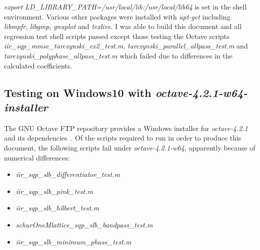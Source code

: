 \documentclass[a4paper,twoside,10pt,english]{report}
\begin{document}
\emph{export LD\_LIBRARY\_PATH=/usr/local/lib:/usr/local/lib64} is set in the
shell environment. Various other packages were installed with \emph{apt-get}
including \emph{libmpfr}, \emph{libgmp}, \emph{gnuplot} and \emph{texlive}. I
was able to build this document and all regression test shell scripts passed
except those testing the Octave scripts
\emph{iir\_sqp\_mmse\_tarczynski\_ex2\_test.m},
\emph{tarczynski\_parallel\_allpass\_test.m} and
\emph{tarczynski\_polyphase\_allpass\_test.m}
which failed due to differences in the calculated coefficients.

\subsection*{Testing on Windows10 with \emph{octave-4.2.1-w64-installer}}
The GNU Octave FTP repository provides a Windows installer for
\emph{octave-4.2.1} and its dependencies~\cite{OctaveWindowsInstaller}. Of the
scripts required to run in order to produce this document, the following
scripts fail under \emph{octave-4.2.1-w64}, apparently because of numerical
differences:
\begin{itemize}
\item \emph{iir\_sqp\_slb\_differentiator\_test.m}
\item \emph{iir\_sqp\_slb\_pink\_test.m}
\item \emph{iir\_sqp\_slb\_hilbert\_test.m}
\item \emph{schurOneMlattice\_sqp\_slb\_bandpass\_test.m}
\item \emph{iir\_sqp\_slb\_minimum\_phase\_test.m}
\end{itemize}

\end{document}

